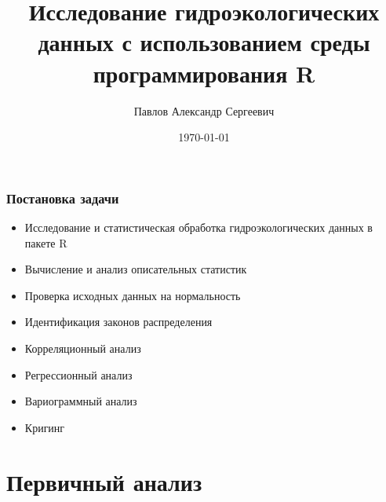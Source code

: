 \documentclass[10pt,pdf,aspectratio=169]{beamer}
\title[Исследование гидроэкологических данных в пакете R]{Исследование гидроэкологических данных с использованием среды программирования R}    %
\author[Павлов Александр]{Павлов Александр Сергеевич}                 %
\institute{Кафедра Теории Вероятностей и Математической Статистики}      %
\date{\today}                    %
\begin{document}
\begin{frame}
  \titlepage
\end{frame}




\section{}

\begin{frame}
  \frametitle{Постановка задачи}   %

  \begin{itemize}
    \item Исследование и статистическая обработка гидроэкологических данных в пакете R
    \item Вычисление и анализ описательных статистик
    \item Проверка исходных данных на нормальность
    \item Идентификация законов распределения
    \item Корреляционный анализ
    \item Регрессионный анализ
    \item Вариограммный анализ
    \item Кригинг
  \end{itemize}
\end{frame}

\section{Первичный анализ}
\end{document}
